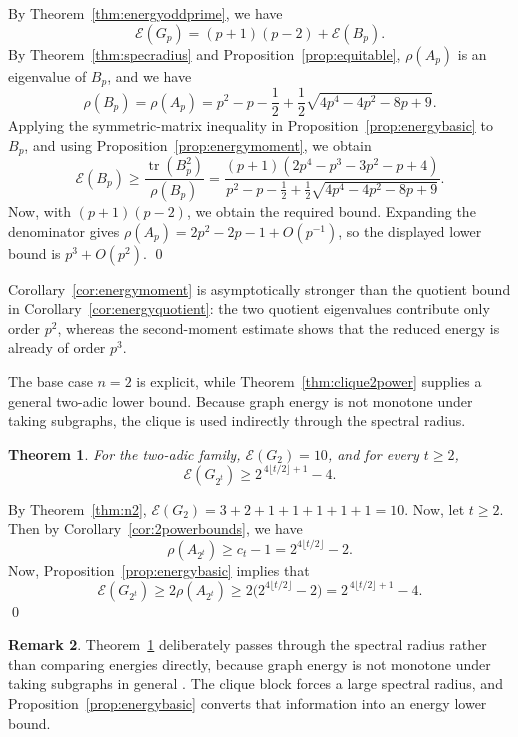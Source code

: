 \documentclass[12pt]{article}
\renewenvironment{proof}{{\bf \noindent Proof.}}{\qed}
\newtheorem{theorem}{Theorem}[section]
\theoremstyle{definition}
\newtheorem{remark}[theorem]{Remark}
\newcommand{\tr}{\operatorname{tr}}
\begin{document}
	\begin{proof}
		By Theorem~\ref{thm:energyoddprime}, we have
		$$
		\mathcal E(G_p)=(p+1)(p-2)+\mathcal E(B_p).
		$$
		By Theorem~\ref{thm:specradius} and Proposition~\ref{prop:equitable}, $\rho(A_p)$ is an eigenvalue of $B_p$, and we have
		$$
		\rho(B_p)=\rho(A_p)
		=
		p^2-p-\frac12+\frac12\sqrt{4p^4-4p^2-8p+9}.
		$$
		Applying the symmetric-matrix inequality in Proposition~\ref{prop:energybasic} to $B_p$, and using Proposition~\ref{prop:energymoment}, we obtain
		$$
		\mathcal E(B_p)\ge \frac{\tr(B_p^2)}{\rho(B_p)}
		=
		\frac{(p+1)(2p^4-p^3-3p^2-p+4)}
		{p^2-p-\frac12+\frac12\sqrt{4p^4-4p^2-8p+9}}.
		$$
		Now, with $(p+1)(p-2)$, we obtain the required bound. Expanding the denominator gives $\rho(A_p)=2p^2-2p-1+O(p^{-1})$, so the displayed lower bound is $p^3+O(p^2)$.
	\end{proof}
	
	\medskip
	Corollary~\ref{cor:energymoment} is asymptotically stronger than the quotient bound in Corollary~\ref{cor:energyquotient}: the two quotient eigenvalues contribute only order $p^2$, whereas the second-moment estimate shows that the reduced energy is already of order $p^3$.
	
	
	\medskip
	The base case $n=2$ is explicit, while Theorem~\ref{thm:clique2power} supplies a general two-adic lower bound. Because graph energy is not monotone under taking subgraphs, the clique is used indirectly through the spectral radius.	
	\begin{theorem}\label{thm:energytwopower}
		For the two-adic family, $\mathcal E(G_2)=10$, and for every $t\ge 2$,
		$$
		\mathcal E(G_{2^t})\ge 2^{\,4\lfloor t/2\rfloor+1}-4.
		$$
	\end{theorem}
	
	\begin{proof}
		By Theorem~\ref{thm:n2},	$\mathcal E(G_2)=3+2+1+1+1+1+1=10.$ Now, let $t\ge 2$. Then by Corollary~\ref{cor:2powerbounds}, we have
		$$
		\rho(A_{2^t})\ge c_t-1=2^{4\lfloor t/2\rfloor}-2.
		$$
		Now, Proposition~\ref{prop:energybasic} implies that
		$$
		\mathcal E(G_{2^t})\ge 2\rho(A_{2^t})
		\ge 2\bigl(2^{4\lfloor t/2\rfloor}-2\bigr)
		=2^{\,4\lfloor t/2\rfloor+1}-4.
		$$
	\end{proof}
	
	\begin{remark}
		Theorem~\ref{thm:energytwopower} deliberately passes through the spectral radius rather than comparing energies directly, because graph energy is not monotone under taking subgraphs in general \cite{li2012energy,nikiforov2016energy}. The clique block forces a large spectral radius, and Proposition~\ref{prop:energybasic} converts that information into an energy lower bound.
	\end{remark}
	
\end{document}
